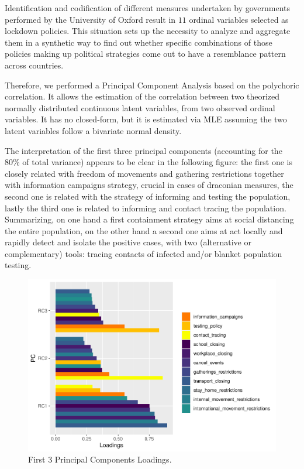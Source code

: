 \documentclass[
  6pt,
]{article}
\begin{document}
Identification and codification of different measures undertaken by
governments performed by the University of Oxford result in \(11\)
ordinal variables selected as lockdown policies. This situation sets up
the necessity to analyze and aggregate them in a synthetic way to find
out whether specific combinations of those policies making up political
strategies come out to have a resemblance pattern across countries.

Therefore, we performed a Principal Component Analysis based on the
polychoric correlation. It allows the estimation of the correlation
between two theorized normally distributed continuous latent variables,
from two observed ordinal variables. It has no closed-form, but it is
estimated via MLE assuming the two latent variables follow a bivariate
normal density.

The interpretation of the first three principal components (accounting
for the 80\% of total variance) appears to be clear in the following
figure: the first one is closely related with freedom of movements and
gathering restrictions together with information campaigns strategy,
crucial in cases of draconian measures, the second one is related with
the strategy of informing and testing the population, lastly the third
one is related to informing and contact tracing the population.
Summarizing, on one hand a first containment strategy aims at social
distancing the entire population, on the other hand a second one aims at
act locally and rapidly detect and isolate the positive cases, with two
(alternative or complementary) tools: tracing contacts of infected
and/or blanket population testing.

\begin{figure}
\centering
\includegraphics{Report_SC_Group3_files/figure-latex/figs-1.pdf}
\caption{\label{fig:figs}First 3 Principal Components Loadings.}
\end{figure}
\end{document}
